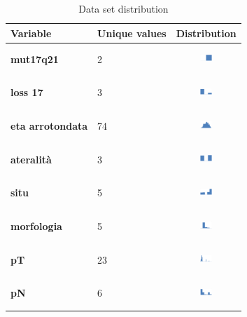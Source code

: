 \begin{table}[htbp]
\caption{Data set distribution}
\begin{tabularx}{\textwidth}{@{} l X c @{}}
\toprule 
\textbf{Variable} & Unique values & Distribution \\
\midrule 
\textbf{mut17q21} & 2 & \includegraphics[width=0.2\textwidth, height=10mm]{methodology/images/mut17q21}  \\
\textbf{loss 17} & 3 & \includegraphics[width=0.2\textwidth, height=10mm]{methodology/images/loss_17}\\
\textbf{eta arrotondata} & 74 & \includegraphics[width=0.2\textwidth, height=10mm]{methodology/images/eta_arrotondata}\\
\textbf{ateralit\`a} & 3 & \includegraphics[width=0.2\textwidth, height=10mm]{methodology/images/lateralita} \\
\textbf{situ} & 5 & \includegraphics[width=0.2\textwidth, height=10mm]{methodology/images/situ} \\
\textbf{morfologia} & 5 & \includegraphics[width=0.2\textwidth, height=10mm]{methodology/images/morfologia} \\
\textbf{pT} & 23 & \includegraphics[width=0.2\textwidth, height=10mm]{methodology/images/pt} \\
\textbf{pN} & 6 & \includegraphics[width=0.2\textwidth, height=10mm]{methodology/images/pn} \\

\end{tabularx}
\end{table}
